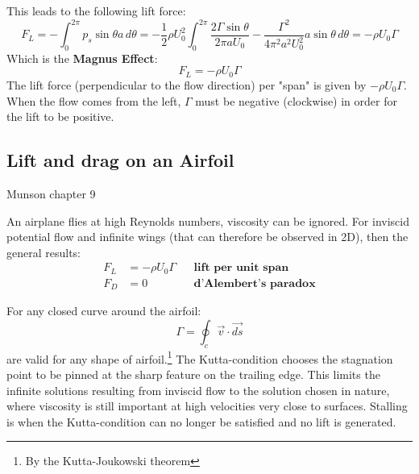 This leads to the following lift force:
\begin{equation*}
	F_L = -\int_0^{2\pi} p_s \sin\theta a\,d\theta= -\frac{1}{2}\rho U_0^2\int_0^{2\pi} \frac{2\Gamma \sin\theta}{2\pi a U_0} - \frac{\Gamma^2}{4\pi^2 a^2 U_0^2}a\sin\theta \,d\theta = -\rho U_0 \Gamma
\end{equation*}
Which is the \textbf{Magnus Effect}:
\begin{equation*}
	\boxed{F_L = -\rho U_0 \Gamma}
\end{equation*}
The lift force (perpendicular to the flow direction) per "span" is given by $-\rho U_0 \Gamma$.
When the flow comes from the left, $\Gamma$ must be negative (clockwise) in order for the lift to be positive.
\subsection{Lift and drag on an Airfoil}
\footnotesize{Munson chapter 9}

An airplane flies at high Reynolds numbers, viscosity can be ignored. For inviscid potential flow and infinite wings (that can therefore be observed in 2D), then the general results:
\begin{equation*}
	\begin{aligned}
		F_L &= -\rho U_0 \Gamma &&\textbf{lift per unit span}\\
		F_D &= 0 && \textbf{d'Alembert's paradox}
	\end{aligned}
\end{equation*}

For any closed curve around the airfoil:
\begin{equation*}
	\Gamma = \oint_c \vec v \cdot \vec{ds}
\end{equation*}
are valid for any shape of airfoil.\footnote{By the Kutta-Joukowski theorem} The Kutta-condition chooses the stagnation point to be pinned at the sharp feature on the trailing edge. This limits the infinite solutions resulting from inviscid flow to the solution chosen in nature, where viscosity is still important at high velocities very close to surfaces. Stalling is when the Kutta-condition can no longer be satisfied and no lift is generated.

